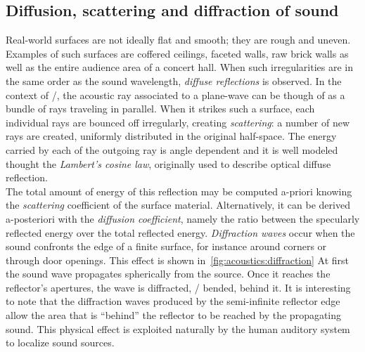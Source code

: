 \subsection{Diffusion, scattering and diffraction of sound}
Real-world surfaces are not ideally flat and smooth; they are rough and uneven.
Examples of such surfaces are coffered ceilings, faceted walls, raw brick walls as well as the entire audience area of a concert hall.
When such irregularities are in the same order as the sound wavelength, \textit{diffuse reflections} is observed.
\mynewline
In the context of \GA/, the acoustic ray associated to a plane-wave can be though of as a bundle of rays traveling in parallel.
When it strikes such a surface, each individual rays are bounced off irregularly, creating \textit{scattering}:
a number of new rays are created, uniformly distributed in the original half-space.
The energy carried by each of the outgoing ray is angle dependent and it
is well modeled thought the \textit{Lambert's cosine law}, originally used to describe optical diffuse reflection.
\\The total amount of energy of this reflection may be computed a-priori
knowing the \textit{scattering} coefficient of the surface material.
Alternatively, it can be derived a-posteriori with the \textit{diffusion coefficient}, namely the ratio between
the specularly reflected energy over the total reflected energy.
\mynewline
\textit{Diffraction waves} occur when the sound confronts the edge of a finite surface, for instance around corners or through door openings.
This effect is shown in~\cref{fig:acoustics:diffraction}
At first the sound wave propagates spherically from the source.
Once it reaches the reflector's  apertures, the wave is diffracted, \ie/ bended, behind it.
It is interesting to note that the diffraction waves produced by the semi-infinite reflector edge
allow the area that is ``behind'' the reflector to be reached by the propagating sound.
This physical effect is exploited naturally by the human auditory system to localize sound sources.

